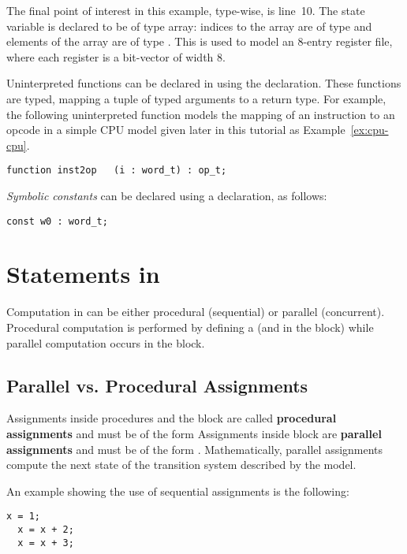 The final point of interest in this example, type-wise, is line~10. The state variable  is declared to be of type array: indices to the array are of type  and elements of the array are of type . This is used to model an 8-entry register file, where each register is a bit-vector of width 8.

Uninterpreted functions can be declared in \uclid{} using the
 declaration. These functions are typed,
mapping a tuple of typed arguments to a return type.
For example, the following uninterpreted function models
the mapping of an instruction to an opcode in a simple
CPU model given later in this tutorial as Example~\ref{ex:cpu-cpu}.
\begin{lstlisting}[language=uclid,style=uclidstyle]
  function inst2op   (i : word_t) : op_t;
\end{lstlisting}
 
{\em Symbolic constants} can be declared using a 
 declaration, as follows:
\begin{lstlisting}[language=uclid,style=uclidstyle]
  const w0 : word_t;
\end{lstlisting}


\section{Statements in \uclid{}}

Computation in \uclid{} can be either procedural (sequential) or parallel (concurrent). Procedural computation is performed by defining a  (and in the  block) while parallel computation occurs in the  block.

\subsection{Parallel vs. Procedural Assignments}
Assignments inside procedures and the  block are called \textbf{procedural assignments} and must be of the form  Assignments inside  block are \textbf{parallel assignments} and must be of the form . Mathematically, parallel assignments compute the next state of the transition system described by the model.

An example showing the use of sequential assignments is the following:

\begin{lstlisting}[language=uclid,style=uclidstyle]
  x = 1;
  x = x + 2;
  x = x + 3;
\end{lstlisting}

